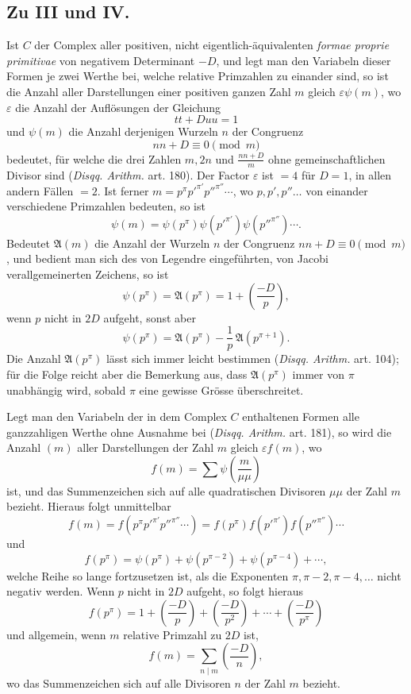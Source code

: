 \documentclass[12pt]{article}
\begin{document}
\subsection*{Zu III und IV.}

Ist \(C\) der Complex aller positiven, nicht eigentlich-äquivalenten \emph{formae proprie primitivae} von negativem Determinant \(-D\), und legt man den Variabeln dieser Formen je zwei Werthe bei, welche relative Primzahlen zu einander sind, so ist die Anzahl aller Darstellungen einer positiven ganzen Zahl \(m\) gleich \(\varepsilon\psi(m)\), wo \(\varepsilon\) die Anzahl der Auflösungen der Gleichung
\[
tt+Duu=1
\]
und \(\psi(m)\) die Anzahl derjenigen Wurzeln \(n\) der Congruenz
\[
nn+D\equiv0\pmod m
\]
bedeutet, für welche die drei Zahlen \(m,2n\) und \(\frac{nn+D}{m}\) ohne gemeinschaftlichen Divisor sind (\emph{Disqq. Arithm.} art. 180). Der Factor \(\varepsilon\) ist \(=4\) für \(D=1\), in allen andern Fällen \(=2\). Ist ferner \(m=p^\pi p'^{\pi'}p''^{\pi''}\cdots\), wo \(p,p',p''\ldots\) von einander verschiedene Primzahlen bedeuten, so ist
\[
\psi(m)=\psi(p^\pi)\psi(p'^{\pi'})\psi(p''^{\pi''})\cdots.
\]
Bedeutet \(\mathfrak A(m)\) die Anzahl der Wurzeln \(n\) der Congruenz \(nn+D\equiv0\pmod m\), und bedient man sich des von Legendre eingeführten, von Jacobi verallgemeinerten Zeichens, so ist
\[
\psi(p^\pi)=\mathfrak A(p^\pi)=1+\left(\frac{-D}{p}\right),
\]
wenn \(p\) nicht in \(2D\) aufgeht, sonst aber
\[
\psi(p^\pi)=\mathfrak A(p^\pi)-\frac1p\,\mathfrak A(p^{\pi+1}).
\]
Die Anzahl \(\mathfrak A(p^\pi)\) lässt sich immer leicht bestimmen (\emph{Disqq. Arithm.} art. 104); für die Folge reicht aber die Bemerkung aus, dass \(\mathfrak A(p^\pi)\) immer von \(\pi\) unabhängig wird, sobald \(\pi\) eine gewisse Grösse überschreitet.

Legt man den Variabeln der in dem Complex \(C\) enthaltenen Formen alle ganzzahligen Werthe ohne Ausnahme bei (\emph{Disqq. Arithm.} art. 181), so wird die Anzahl \((m)\) aller Darstellungen der Zahl \(m\) gleich \(\varepsilon f(m)\), wo
\[
f(m)=\sum\psi\!\left(\frac{m}{\mu\mu}\right)
\]
ist, und das Summenzeichen sich auf alle quadratischen Divisoren \(\mu\mu\) der Zahl \(m\) bezieht. Hieraus folgt unmittelbar
\[
f(m)=f(p^\pi p'^{\pi'}p''^{\pi''}\cdots)=f(p^\pi)f(p'^{\pi'})f(p''^{\pi''})\cdots
\]
und
\[
f(p^\pi)=\psi(p^\pi)+\psi(p^{\pi-2})+\psi(p^{\pi-4})+\cdots,
\]
welche Reihe so lange fortzusetzen ist, als die Exponenten \(\pi,\pi-2,\pi-4,\ldots\) nicht negativ werden. Wenn \(p\) nicht in \(2D\) aufgeht, so folgt hieraus
\[
f(p^\pi)=1+\left(\frac{-D}{p}\right)+\left(\frac{-D}{p^2}\right)+\cdots+\left(\frac{-D}{p^\pi}\right)
\]
und allgemein, wenn \(m\) relative Primzahl zu \(2D\) ist,
\[
f(m)=\sum_{n\mid m}\left(\frac{-D}{n}\right),
\]
wo das Summenzeichen sich auf alle Divisoren \(n\) der Zahl \(m\) bezieht.
\end{document}
